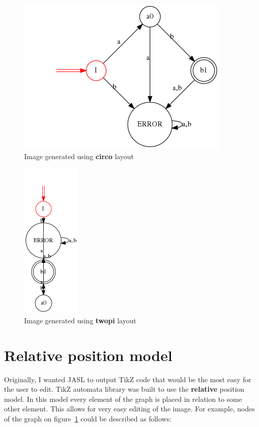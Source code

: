 \documentclass{ctuthesis}
\begin{document}
\begin{figure}[H]
\includegraphics[width=0.7\linewidth]{figures/layouts_circo.png}
\caption{Image generated using \textbf{circo} layout}
\label{fig:layout_diff_circo}
\end{figure}

\begin{figure}[H]
\includegraphics[width=0.2\linewidth]{figures/layouts_twopi.png}
\caption{Image generated using \textbf{twopi} layout}
\label{fig:layout_diff_twopi}
\end{figure}

\section{Relative position model}
\label{sec:relpos}
Originally, I wanted JASL to output TikZ code that would be the most easy for the user to edit. TikZ automata library was built to use the \textbf{relative} position model. In this model every element of the graph is placed in relation to some other element. This allows for very easy editing of the image. For example, nodes of the graph on figure~\ref{fig:layout_diff_circo} could be described as follows:
\end{document}
